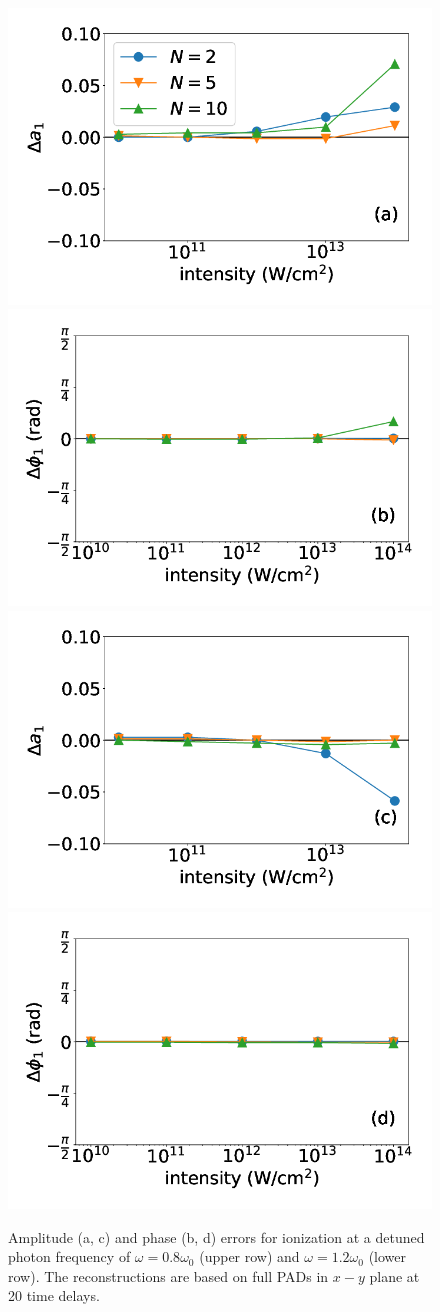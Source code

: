 \begin{figure}[!ht]
\centering
\includegraphics[width=0.49\linewidth]{figs/Photo_ionization/superpositions/Venzke_new_fig_6a.png}
\includegraphics[width=0.49\linewidth]{figs/Photo_ionization/superpositions/Venzke_new_fig_6b.png}
\includegraphics[width=0.49\linewidth]{figs/Photo_ionization/superpositions/Venzke_new_fig_6c.png}
\includegraphics[width=0.49\linewidth]{figs/Photo_ionization/superpositions/Venzke_new_fig_6d.png} 
\caption{
Amplitude (a, c) and phase (b, d) errors for ionization at a detuned photon frequency of $\omega=0.8\omega_0$ (upper row) and $\omega=1.2\omega_0$ (lower row). The reconstructions are based on full PADs in $x-y$ plane at 20 time delays.
} 
  \label{fig:detuned}
\end{figure}

